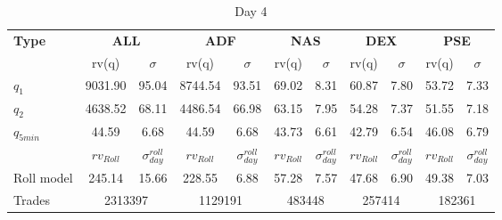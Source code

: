 \documentclass{article}
\begin{document}
\begin{table}[H]
\centering
\begin{adjustbox}{width=\textwidth}
\begin{tabular}{lcccccccccc}
\toprule
\textbf{Type} & \multicolumn{2}{c}{\textbf{ALL}} & \multicolumn{2}{c}{\textbf{ADF}} & \multicolumn{2}{c}{\textbf{NAS}} & \multicolumn{2}{c}{\textbf{DEX}} & \multicolumn{2}{c}{\textbf{PSE}} \\
\cmidrule(lr){2-3} \cmidrule(lr){4-5} \cmidrule(lr){6-7} \cmidrule(lr){8-9} \cmidrule(lr){10-11}
 & rv(q) & $\sigma$ & rv(q) & $\sigma$ & rv(q) & $\sigma$ & rv(q) & $\sigma$ & rv(q) & $\sigma$ \\
\midrule
$q_1$       & 9031.90 & 95.04 & 8744.54 & 93.51 & 69.02 & 8.31 & 60.87 & 7.80 & 53.72 & 7.33 \\
$q_2$       & 4638.52 & 68.11 & 4486.54 & 66.98 & 63.15 & 7.95 & 54.28 & 7.37 & 51.55 & 7.18 \\
$q_{5min}$   & 44.59   & 6.68  & 44.59   & 6.68  & 43.73 & 6.61 & 42.79 & 6.54 & 46.08 & 6.79 \\
\midrule
& {$rv_{Roll}$} & {$\sigma_{day}^{roll}$} & {$rv_{Roll}$} & {$\sigma_{day}^{roll}$} & {$rv_{Roll}$} & {$\sigma_{day}^{roll}$}& {$rv_{Roll}$} & {$\sigma_{day}^{roll}$}& {$rv_{Roll}$} & {$\sigma_{day}^{roll}$} \\
Roll model & 245.14  & 15.66 & 228.55  & 6.88  & 57.28 & 7.57 & 47.68 & 6.90 & 49.38 & 7.03 \\
Trades     & \multicolumn{2}{c}{2313397} & \multicolumn{2}{c}{1129191} & \multicolumn{2}{c}{483448} & \multicolumn{2}{c}{257414} & \multicolumn{2}{c}{182361} \\
\bottomrule
\end{tabular}
\end{adjustbox}
\caption{Day 4}
\label{tab:latest_summary_table}
\end{table}
\end{document}
